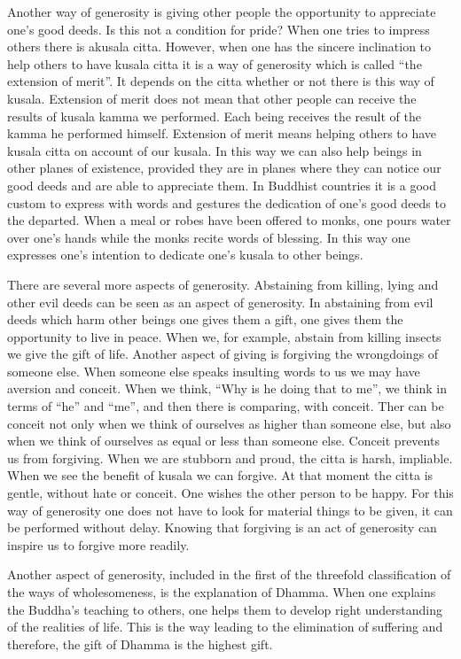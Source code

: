 \documentclass{book}
\begin{document}
Another way of generosity is giving other people the opportunity to
appreciate one's good deeds. Is this not a condition for pride? When one
tries to impress others there is akusala citta. However, when one has
the sincere inclination to help others to have kusala citta it is a way
of generosity which is called ``the extension of merit''. It depends on
the citta whether or not there is this way of kusala. Extension of merit
does not mean that other people can receive the results of kusala kamma
we performed. Each being receives the result of the kamma he performed
himself. Extension of merit means helping others to have kusala citta on
account of our kusala. In this way we can also help beings in other
planes of existence, provided they are in planes where they can notice
our good deeds and are able to appreciate them. In Buddhist countries it
is a good custom to express with words and gestures the dedication of
one's good deeds to the departed. When a meal or robes have been offered
to monks, one pours water over one's hands while the monks recite words
of blessing. In this way one expresses one's intention to dedicate one's
kusala to other beings.

There are several more aspects of generosity. Abstaining from killing,
lying and other evil deeds can be seen as an aspect of generosity. In
abstaining from evil deeds which harm other beings one gives them a
gift, one gives them the opportunity to live in peace. When we, for
example, abstain from killing insects we give the gift of life. Another
aspect of giving is forgiving the wrongdoings of someone else. When
someone else speaks insulting words to us we may have aversion and
conceit. When we think, ``Why is he doing that to me'', we think in
terms of ``he'' and ``me'', and then there is comparing, with conceit.
Ther can be conceit not only when we think of ourselves as higher than
someone else, but also when we think of ourselves as equal or less than
someone else. Conceit prevents us from forgiving. When we are stubborn
and proud, the citta is harsh, impliable. When we see the benefit of
kusala we can forgive. At that moment the citta is gentle, without hate
or conceit. One wishes the other person to be happy. For this way of
generosity one does not have to look for material things to be given, it
can be performed without delay. Knowing that forgiving is an act of
generosity can inspire us to forgive more readily.

Another aspect of generosity, included in the first of the threefold
classification of the ways of wholesomeness, is the explanation of
Dhamma. When one explains the Buddha's teaching to others, one helps
them to develop right understanding of the realities of life. This is
the way leading to the elimination of suffering and therefore, the gift
of Dhamma is the highest gift.
\end{document}
